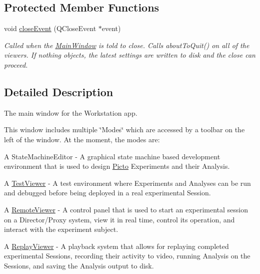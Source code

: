 \subsection*{Protected Member Functions}
\begin{DoxyCompactItemize}
\item 
\hypertarget{class_main_window_a4e20a4a065fbb0e4d3532a45a0a91425}{void \hyperlink{class_main_window_a4e20a4a065fbb0e4d3532a45a0a91425}{close\-Event} (Q\-Close\-Event $\ast$event)}\label{class_main_window_a4e20a4a065fbb0e4d3532a45a0a91425}

\begin{DoxyCompactList}\small\item\em Called when the \hyperlink{class_main_window}{Main\-Window} is told to close. Calls about\-To\-Quit() on all of the viewers. If nothing objects, the latest settings are written to disk and the close can proceed. \end{DoxyCompactList}\end{DoxyCompactItemize}


\subsection{Detailed Description}
The main window for the Workstation app. 

This window includes multiple \char`\"{}\-Modes\char`\"{} which are accessed by a toolbar on the left of the window. At the moment, the modes are\-:
\begin{DoxyItemize}
\item A State\-Machine\-Editor -\/ A graphical state machine based development environment that is used to design \hyperlink{namespace_picto}{Picto} Experiments and their Analysis.
\item A \hyperlink{class_test_viewer}{Test\-Viewer} -\/ A test environment where Experiments and Analyses can be run and debugged before being deployed in a real experimental Session.
\item A \hyperlink{class_remote_viewer}{Remote\-Viewer} -\/ A control panel that is used to start an experimental session on a Director/\-Proxy system, view it in real time, control its operation, and interact with the experiment subject.
\item A \hyperlink{class_replay_viewer}{Replay\-Viewer} -\/ A playback system that allows for replaying completed experimental Sessions, recording their activity to video, running Analysis on the Sessions, and saving the Analysis output to disk.
\end{DoxyItemize}

